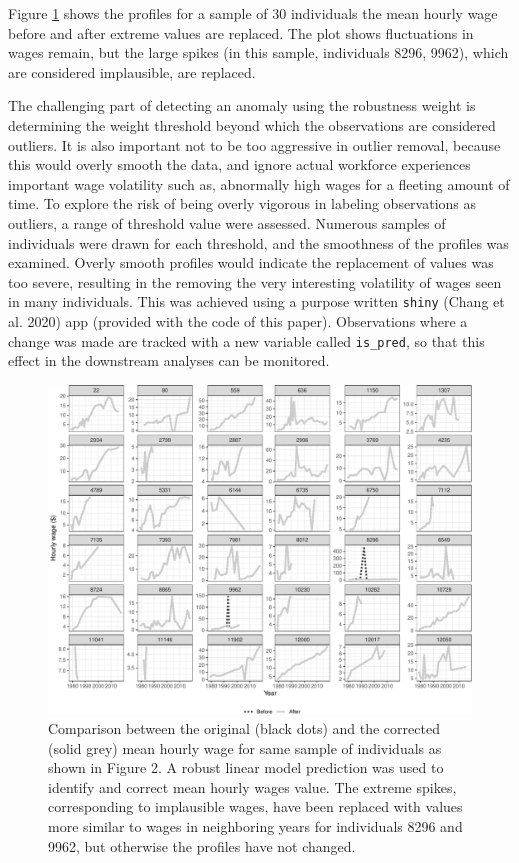 \documentclass[12pt]{article}
\begin{document}
Figure \ref{fig:compare-plot} shows the profiles for a sample of 30 individuals the mean hourly wage before and after extreme values are replaced. The plot shows fluctuations in wages remain, but the large spikes (in this sample, individuals 8296, 9962), which are considered implausible, are replaced.

The challenging part of detecting an anomaly using the robustness weight is determining the weight threshold beyond which the observations are considered outliers. It is also important not to be too aggressive in outlier removal, because this would overly smooth the data, and ignore actual workforce experiences important wage volatility such as, abnormally high wages for a fleeting amount of time. To explore the risk of being overly vigorous in labeling observations as outliers, a range of threshold value were assessed. Numerous samples of individuals were drawn for each threshold, and the smoothness of the profiles was examined. Overly smooth profiles would indicate the replacement of values was too severe, resulting in the removing the very interesting volatility of wages seen in many individuals. This was achieved using a purpose written \texttt{shiny} (Chang et al. 2020) app (provided with the code of this paper). Observations where a change was made are tracked with a new variable called \texttt{is\_pred}, so that this effect in the downstream analyses can be monitored.

\begin{figure}

{\centering \includegraphics[width=0.9\linewidth]{figures/compare-plot-1} 

}

\caption{Comparison between the original (black dots) and the corrected (solid grey) mean hourly wage for same sample of individuals as shown in Figure 2. A robust linear model prediction was used to identify and correct mean hourly wages value. The extreme spikes, corresponding to implausible wages, have been replaced with values more similar to wages in neighboring years for individuals 8296 and 9962, but otherwise the profiles have not changed.}\label{fig:compare-plot}
\end{figure}
\end{document}
